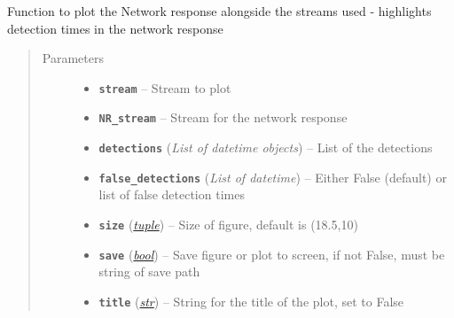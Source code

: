 \documentclass[a4paper,10pt,english]{sphinxmanual}
\begin{document}
\begin{fulllineitems}
\label{utils:EQcorrscan_plotting.NR_plot}
Function to plot the Network response alongside the streams used - highlights
detection times in the network response
\begin{quote}\begin{description}
\item[{Parameters}] \leavevmode\begin{itemize}
\item {} 
\textbf{\texttt{stream}} -- Stream to plot

\item {} 
\textbf{\texttt{NR\_stream}} -- Stream for the network response

\item {} 
\textbf{\texttt{detections}} (\emph{List of datetime objects}) -- List of the detections

\item {} 
\textbf{\texttt{false\_detections}} (\emph{List of datetime}) -- Either False (default) or list of false detection     times

\item {} 
\textbf{\texttt{size}} (\href{https://docs.python.org/library/functions.html\#tuple}{\emph{tuple}}) -- Size of figure, default is (18.5,10)

\item {} 
\textbf{\texttt{save}} (\href{https://docs.python.org/library/functions.html\#bool}{\emph{bool}}) -- Save figure or plot to screen, if not False, must be string of        save path

\item {} 
\textbf{\texttt{title}} (\href{https://docs.python.org/library/functions.html\#str}{\emph{str}}) -- String for the title of the plot, set to False

\end{itemize}

\end{description}\end{quote}

\end{fulllineitems}

\end{document}
